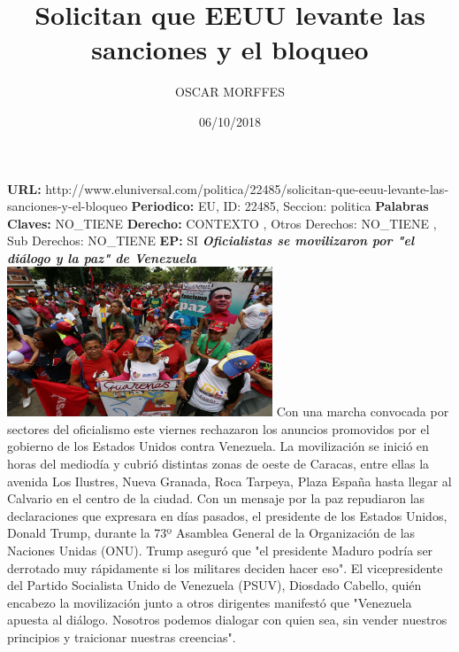 \documentclass{article}%
\title{\textbf{Solicitan que EEUU levante las sanciones y el bloqueo}}%
\author{OSCAR  MORFFES}%
\date{06/10/2018}%
\begin{document}
%
\normalsize%
\maketitle%
\textbf{URL: }%
http://www.eluniversal.com/politica/22485/solicitan{-}que{-}eeuu{-}levante{-}las{-}sanciones{-}y{-}el{-}bloqueo\newline%
%
\textbf{Periodico: }%
EU, %
ID: %
22485, %
Seccion: %
politica\newline%
%
\textbf{Palabras Claves: }%
NO\_TIENE\newline%
%
\textbf{Derecho: }%
CONTEXTO%
, Otros Derechos: %
NO\_TIENE%
, Sub Derechos: %
NO\_TIENE%
\newline%
%
\textbf{EP: }%
SI\newline%
\newline%
%
\textbf{\textit{Oficialistas se movilizaron por "el diálogo y la paz" de Venezuela}}%
\newline%
\newline%
%
\includegraphics[width=300px]{6.jpg}%
\newline%
%
Con una marcha convocada por sectores del oficialismo este viernes rechazaron los anuncios promovidos por el gobierno de los Estados Unidos contra Venezuela.\newline%
La movilización se inició en horas del mediodía y cubrió distintas zonas de oeste de Caracas, entre ellas la avenida Los Ilustres, Nueva Granada, Roca Tarpeya, Plaza España hasta llegar al Calvario en el centro de la ciudad.%
\newline%
%
Con un mensaje por la paz repudiaron las declaraciones que expresara en días pasados,  el presidente de los Estados Unidos, Donald Trump, durante la 73º Asamblea General de la Organización de las Naciones Unidas (ONU).  Trump aseguró que "el presidente Maduro podría ser derrotado muy rápidamente si los militares deciden hacer eso".%
\newline%
%
El vicepresidente del Partido Socialista Unido de Venezuela (PSUV), Diosdado Cabello, quién encabezo la movilización junto a otros dirigentes manifestó que "Venezuela apuesta al diálogo. Nosotros podemos dialogar con quien sea, sin vender nuestros principios y traicionar nuestras creencias".%
\end{document}
